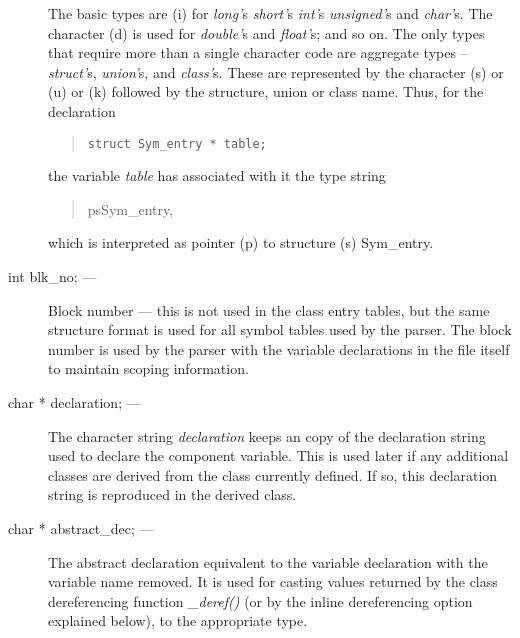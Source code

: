 \begin{description}
The basic types are (i) for
{\em long'}s {\em short'}s {\em int'}s {\em unsigned'}s and {\em char'}s.
The character (d) is used for {\em double'}s and {\em float'}s; and so on.
The only types that require more than a single character code
are aggregate types --
{\em struct'}s, {\em union'}s, and {\em class'}s.  These are represented
by the character (s) or (u) or (k) followed by the structure,
union or class name.  Thus, for the declaration
\begin{quote} \tt struct Sym\_entry * table; \end{quote}
the variable {\em table} has associated with it the type string
\begin{quote} psSym\_entry, \end{quote}
which is interpreted as pointer (p) to structure (s) Sym\_entry.
\item[int blk\_no; ---]
Block number --- this is not used in the class entry tables, but
the same structure format is used for all symbol tables used by the parser.
The block number is used by the parser with the variable declarations
in the file itself to maintain scoping information.
\item[char * declaration; ---]
The character string {\em declaration}
keeps an copy of the declaration string used to declare the component variable.
This is used later if any additional classes are derived from the class
currently defined.  If so, this declaration string is reproduced in the
derived class.
\item[char * abstract\_dec; ---]
The abstract declaration equivalent to the variable declaration with the
variable name removed.  It is used for casting values returned by the class
dereferencing function {\em \_deref()} (or by the inline dereferencing option
explained below), to the appropriate type.
\end{description}

